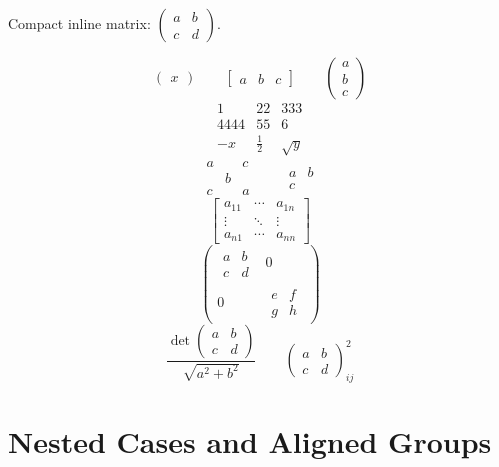 \documentclass[12pt]{article}
\begin{document}
Compact inline matrix: $\left(\begin{smallmatrix}a&b\\c&d\end{smallmatrix}\right)$.

\[
\begin{pmatrix}x\end{pmatrix}
\qquad \begin{bmatrix}a&b&c\end{bmatrix}
\qquad \begin{pmatrix}a\\b\\c\end{pmatrix}
\]
\[
\begin{array}{lcr}
1 & 22 & 333 \\
4444 & 55 & 6 \\
-x & \frac{1}{2} & \sqrt{y}
\end{array}
\]
\[
\begin{matrix}
a & & c \\
& b & \\
c & & a
\end{matrix}
\qquad \begin{matrix}a&b\\c\end{matrix}
\]
\[
\begin{bmatrix}
a_{11} & \cdots & a_{1n} \\
\vdots & \ddots & \vdots \\
a_{n1} & \cdots & a_{nn}
\end{bmatrix}
\]
\[
\begin{pmatrix}
\begin{matrix}a&b\\c&d\end{matrix} & 0 \\
0 & \begin{matrix}e&f\\g&h\end{matrix}
\end{pmatrix}
\]
\[
\frac{\det\begin{pmatrix}a&b\\c&d\end{pmatrix}}{\sqrt{a^2+b^2}}
\qquad \begin{pmatrix}a&b\\c&d\end{pmatrix}_{ij}^{2}
\]

\section{Nested Cases and Aligned Groups}
\end{document}
